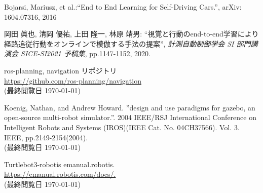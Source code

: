 \documentclass[10pt]{ujarticle}
\begin{document}
    \vspace{5truemm}
    {\footnotesize
        \begin{thebibliography}{99}

            Bojarsi, Mariusz, et al.:``End to End Learning for Self-Driving Cars.'', arXiv: 1604.07316, 2016
            
            岡田 眞也, 清岡 優祐, 上田 隆一, 林原 靖男: ``視覚と行動のend-to-end学習により経路追従行動をオンラインで模倣する手法の提案'', \textit{計測自動制御学会 SI 部門講演会 SICE-SI2021 予稿集}, pp.1147-1152, 2020.



            ros-planning, navigation リポジトリ\\
            \url{https://github.com/ros-planning/navigation}\\
            (最終閲覧日 \today)


            Koenig, Nathan, and Andrew Howard. ”design and use paradigms for gazebo, an open-source multi-robot simulator.”. 2004 IEEE/RSJ International Conference on Intelligent Robots and Systems (IROS)(IEEE Cat. No. 04CH37566). Vol. 3. IEEE, pp.2149-2154(2004).\\
            (最終閲覧日 \today)

            Turtlebot3-robotis emanual.robotis.\\
            \url{https://emanual.robotis.com/docs/.}\\
            (最終閲覧日 \today)
            
        \end{thebibliography}
    }
\end{document}
